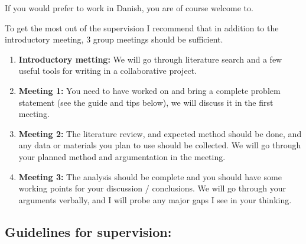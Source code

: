 \documentclass[10pt,twoside]{article}
\begin{document}
If you would prefer to work in Danish, you are of course welcome to.

To get the most out of the supervision I recommend that in addition to
the introductory meeting, 3 group meetings should be sufficient.

\begin{enumerate}
\def\labelenumi{\arabic{enumi}.}
\setcounter{enumi}{-1}
\item
  \textbf{Introductory metting:} We will go through literature search
  and a few useful tools for writing in a collaborative project.
\item
  \textbf{Meeting 1:} You need to have worked on and bring a complete
  problem statement (see the guide and tips below), we will discuss it
  in the first meeting.
\item
  \textbf{Meeting 2:} The literature review, and expected method should
  be done, and any data or materials you plan to use should be
  collected. We will go through your planned method and argumentation in
  the meeting.
\item
  \textbf{Meeting 3:} The analysis should be complete and you should
  have some working points for your discussion / conclusions. We will go
  through your arguments verbally, and I will probe any major gaps I see
  in your thinking.
\end{enumerate}

\hypertarget{guidelines-for-supervision}{%
\subsection{Guidelines for
supervision:}\label{guidelines-for-supervision}}
\end{document}
